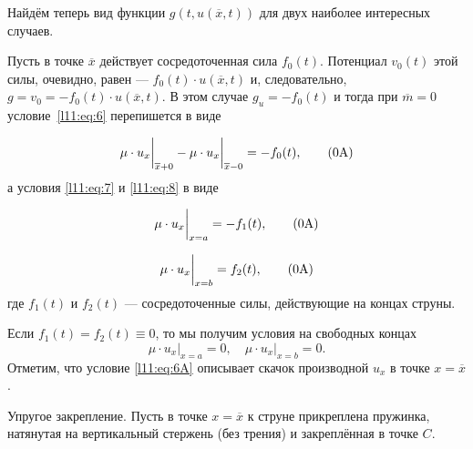 Найдём теперь вид функции $g(t,u(\overline{x},t))$ для двух наиболее интересных случаев.
\begin{enumerateA}
	\item\label{l11:enum:A} Пусть в точке $\overline{x}$ действует сосредоточенная сила $f_0(t)$. Потенциал $v_0(t)$ этой силы, очевидно, равен --- $f_0(t)\cdot u(\overline{x},t)$ и, следовательно, $g=v_0=-f_0(t)\cdot u(\overline{x},t)$. В этом случае $g_u=-f_0(t)$ и тогда при $\overline{m}=0$ условие~\eqref{l11:eq:6} перепишется в виде%
	\addtocounter{equation}{-2}%
	\begin{equation}
		\label{l11:eq:6A}
		\mu\cdot u_x\bigg|_{\overline{x}+0}-\mu\cdot u_x\bigg|_{\overline{x}-0}=-f_0(t), \tag{\theequation{}A}
	\end{equation} 
	а условия \eqref{l11:eq:7} и \eqref{l11:eq:8} в виде%
	\addtocounter{equation}{1}%
	\begin{equation}
		\label{l11:eq:7A}
		\mu\cdot u_x\bigg|_{x=a}=-f_1(t),\tag{\theequation{}A}
	\end{equation}
	\addtocounter{equation}{1}%
	\begin{equation}
		\label{l11:eq:8A}
		\mu\cdot u_x\bigg|_{x=b}=f_2(t),\tag{\theequation{}A}
	\end{equation}
	где $f_1(t)$ и $f_2(t)$ --- сосредоточенные силы, действующие на концах струны. 
	
	\noindent Если $f_1(t)=f_2(t)\equiv0$, то мы получим условия на свободных концах
	\begin{equation}
		\label{l11:eq:9}
		 \mu\cdot u_x\bigg|_{x=a}=0,\quad\mu\cdot u_x\bigg|_{x=b}=0.
	\end{equation}
	Отметим, что условие \eqref{l11:eq:6A} описывает скачок производной $u_x$ в точке $x=\overline{x}$.
	\item Упругое закрепление. Пусть в точке $x=\overline{x}$ к струне прикреплена пружинка, натянутая на вертикальный стержень (без трения) и закреплённая в точке $C$.
	\begin{figure}[H]\centering
	
	\begin{tikzpicture}[x=0.75pt,y=0.75pt,yscale=-1,xscale=1]
		

\end{tikzpicture}
\end{figure}
\end{enumerateA}
